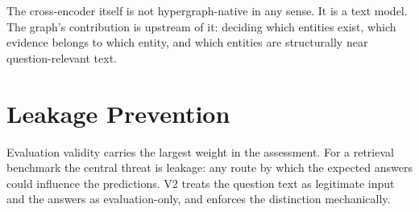 \documentclass[11pt,a4paper]{article}
\theoremstyle{remark}
\begin{document}
The cross-encoder itself is not hypergraph-native in any sense. It is a text model. The
graph's contribution is upstream of it: deciding which entities exist, which evidence
belongs to which entity, and which entities are structurally near question-relevant text.

\section{Leakage Prevention}
\label{sec:leakage}

Evaluation validity carries the largest weight in the assessment. For a retrieval
benchmark the central threat is leakage: any route by which the expected answers could
influence the predictions. V2 treats the question text as legitimate input and the
answers as evaluation-only, and enforces the distinction mechanically.
\end{document}
